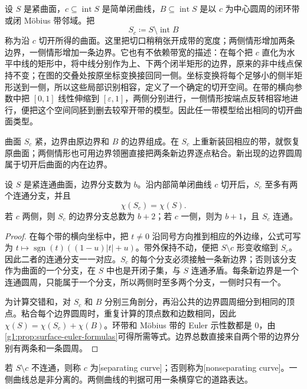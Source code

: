 \begin{definition}\label{g1:def:cut-surface}
	设 \(S\) 是紧曲面，\(c\subseteq\operatorname{int}S\) 是简单闭曲线，\(B\subseteq\operatorname{int}S\) 是以 \(c\) 为中心圆周的闭环带或闭 Möbius 带邻域。把
	\[
		S_c\coloneqq S\setminus\operatorname{int}B
	\]
	称为沿 \(c\) 切开所得的曲面。这里把切口稍稍张开成带的宽度；两侧情形增加两条边界，一侧情形增加一条边界。它也有不依赖带宽的描述：在每个把 \(c\) 直化为水平中线的矩形中，将中线分别作为上、下两个闭半矩形的边界，原来的非中线点保持不变；在图的交叠处按原坐标变换接回同一侧。坐标变换将每个足够小的侧半矩形送到一侧，所以这些局部识别相容，定义了一个确定的切开空间。在带的横向参数中把 \([0,1]\) 线性伸缩到 \([\varepsilon,1]\)，两侧分别进行，一侧情形按端点反转相容地进行，便把这个空间同胚到删去较窄开带的模型。因此任一带模型给出相同的切开曲面类型。
\end{definition}

曲面 \(S_c\) 紧，边界由原边界和 \(B\) 的边界组成。在 \(S_c\) 上重新装回相应的带，就恢复原曲面；两侧情形也可用边界领圈直接把两条新边界逐点粘合。新出现的边界圆周属于切开后曲面的内在边界。

\begin{proposition}\label{g1:prop:cut-surface-euler}
	设 \(S\) 是紧连通曲面，边界分支数为 \(b\)。沿内部简单闭曲线 \(c\) 切开后，\(S_c\) 至多有两个连通分支，并且
	\[
		\chi(S_c)=\chi(S).
	\]
	若 \(c\) 两侧，则 \(S_c\) 的边界分支总数为 \(b+2\)；若 \(c\) 一侧，则为 \(b+1\)，且 \(S_c\) 连通。
\end{proposition}
\begin{proof}
	在每个带的横向坐标中，把 \(t\ne0\) 沿同号方向推到相应的外边缘，公式可写为 \(t\mapsto \operatorname{sgn}(t)((1-u)|t|+u)\)。带外保持不动，便把 \(S\setminus c\) 形变收缩到 \(S_c\)。因此二者的连通分支一一对应。\(S_c\) 的每个分支必须接触一条新边界；否则该分支作为曲面的一个分支，在 \(S\) 中也是开闭子集，与 \(S\) 连通矛盾。每条新边界是一个连通圆周，只能属于一个分支，所以两侧时至多两个分支，一侧时只有一个。

	为计算交错和，对 \(S_c\) 和 \(B\) 分别三角剖分，再沿公共的边界圆周细分到相同的顶点。粘合每个边界圆周时，重复计算的顶点数和边数相同，因此 \(\chi(S)=\chi(S_c)+\chi(B)\)。环带和 Möbius 带的 Euler 示性数都是 \(0\)，由\cref{g1:prop:surface-euler-formulas}可得所需等式。边界总数直接来自两个带的边界分别有两条和一条圆周。
\end{proof}

若 \(S\setminus c\) 不连通，则称 \(c\) 为[separating curve]；否则称为[nonseparating curve]。一侧曲线总是非分离的。两侧曲线的判据可用一条横穿它的道路表达。

